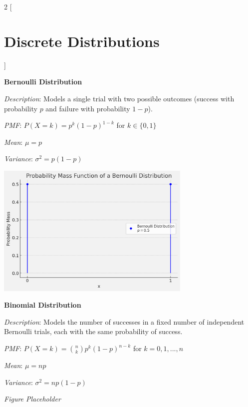 \documentclass{article}
\begin{document}
\begin{multicols}{2}
[
\section*{Discrete Distributions}
]

\begin{mdframed}
\textbf{Bernoulli Distribution}

\textit{Description}: Models a single trial with two possible outcomes (success with probability $p$ and failure with probability $1-p$).

\textit{PMF}: $P(X=k) = p^k(1-p)^{1-k}$ for $k \in \{0,1\}$

\textit{Mean}: $\mu = p$

\textit{Variance}: $\sigma^2 = p(1-p)$

\begin{center}
  \includegraphics*[width=0.7\textwidth]{bernoulli.png}
\end{center}

\end{mdframed}

\begin{mdframed}
\textbf{Binomial Distribution}

\textit{Description}: Models the number of successes in a fixed number of independent Bernoulli trials, each with the same probability of success.

\textit{PMF}: $P(X=k) = \binom{n}{k}p^k(1-p)^{n-k}$ for $k = 0, 1, ..., n$

\textit{Mean}: $\mu = np$

\textit{Variance}: $\sigma^2 = np(1-p)$

\textit{Figure Placeholder}

\end{mdframed}

\end{multicols}
\end{document}
